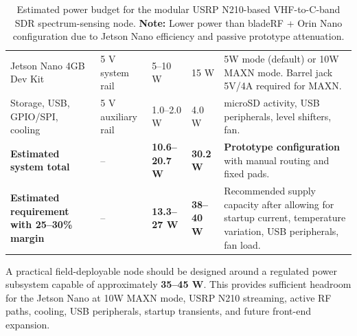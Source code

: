\documentclass[11pt,a4paper]{article}
\begin{document}
\begin{table}[htbp]
\begin{tabular}{p{4.0cm}p{2.0cm}p{2.2cm}p{2.2cm}p{4.2cm}}
			Jetson Nano 4GB Dev Kit &
			5 V system rail &
			5--10 W &
			15 W &
			5W mode (default) or 10W MAXN mode. Barrel jack 5V/4A required for MAXN. \\
			
			Storage, USB, GPIO/SPI, cooling &
			5 V auxiliary rail &
			1.0--2.0 W &
			4.0 W &
			microSD activity, USB peripherals, level shifters, fan. \\
			
			\midrule
			
			\textbf{Estimated system total} &
			-- &
			\textbf{10.6--20.7 W} &
			\textbf{30.2 W} &
			\textbf{Prototype configuration} with manual routing and fixed pads. \\
			
			\textbf{Estimated requirement with 25--30\% margin} &
			-- &
			\textbf{13.3--27 W} &
			\textbf{38--40 W} &
			Recommended supply capacity after allowing for startup current,
			temperature variation, USB peripherals, fan load. \\
			
			\bottomrule
		\end{tabular}
		\caption{Estimated power budget for the modular USRP N210-based VHF-to-C-band SDR spectrum-sensing node.
			\textbf{Note:} Lower power than bladeRF + Orin Nano configuration due to Jetson Nano efficiency and passive prototype attenuation.}
		\label{tab:power-budget}
	\end{table}
	
	A practical field-deployable node should be designed around a regulated power
	subsystem capable of approximately \textbf{35--45 W}. This provides sufficient
	headroom for the Jetson Nano at 10W MAXN mode, USRP N210 streaming, active RF
	paths, cooling, USB peripherals, startup transients, and future front-end
	expansion.
	
\end{document}
